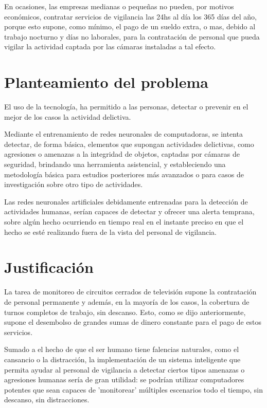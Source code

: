 \documentclass[a4paper,12pt,oneside,spanish]{book}
\begin{document}
En ocasiones, las empresas medianas o pequeñas no pueden, por motivos económicos, contratar servicios de vigilancia las 24hs al día los 365 días del año, porque esto supone, como mínimo, el pago de un sueldo extra, o mas, debido al trabajo nocturno y días no laborales, para la contratación de personal que pueda vigilar la actividad captada por las cámaras instaladas a tal efecto.\par

\section{Planteamiento del problema}
El uso de la tecnología, ha permitido a las personas, detectar o prevenir en el mejor de los casos la actividad delictiva.\par

Mediante el entrenamiento de redes neuronales de computadoras, se intenta detectar, de forma básica, elementos que supongan actividades delictivas, como agresiones o amenazas a la integridad de objetos, captadas por cámaras de seguridad, brindando una herramienta asistencial, y estableciendo una metodología básica para estudios posteriores más avanzados o para casos de investigación sobre otro tipo de actividades.
\par

Las redes neuronales artificiales debidamente entrenadas para la detección de actividades humanas, serían capaces de detectar y ofrecer una alerta temprana, sobre algún hecho ocurriendo en tiempo real en el instante preciso en que el hecho se esté realizando fuera de la vista del personal de vigilancia.\par

\section{Justificación}
La tarea de monitoreo de circuitos cerrados de televisión supone la contratación de personal permanente y además, en la mayoría de los casos, la cobertura de  turnos completos de trabajo, sin descanso. Esto, como se dijo anteriormente, supone el desembolso de grandes sumas de dinero constante para el pago de estos servicios.\par

Sumado a el hecho de que el ser humano tiene falencias naturales, como el cansancio o la distracción, la implementación de un sistema inteligente que permita ayudar al personal de vigilancia a detectar ciertos tipos amenazas o agresiones humanas sería de gran utilidad: se podrían utilizar computadores potentes que sean capaces de 'monitorear'  múltiples escenarios todo el tiempo, sin descanso, sin distracciones.\par 
 
\end{document}
